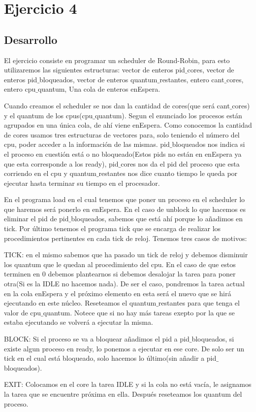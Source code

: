 \section{Ejercicio 4}

\subsection{Desarrollo}
El ejercicio consiste en programar un scheduler de Round-Robin, para esto utilizaremos las siguientes estructuras: vector de enteros pid$\_$cores, vector de enteros pid$\_$bloqueados, 
vector de enteros quantum$\_$restantes, entero cant$\_$cores, entero cpu$\_$quantum, Una cola de enteros enEspera.

Cuando creamos el scheduler se nos dan la cantidad de cores(que será cant$\_$cores) y el quantum de los cpus(cpu$\_$quantum). Segun el enunciado los procesos están agrupados 
en una única cola, de ahí viene enEspera. Como conocemos la cantidad de cores usamos tres estructuras de vectores para, solo teniendo el número del cpu, poder acceder a la 
información de las mismas. pid$\_$bloqueados nos indica si el proceso en cuestión está o no bloqueado(Estos pids no están en enEspera ya que esta corresponde a los
ready), pid$\_$cores nos da el pid del proceso que esta corriendo en el cpu y quantum$\_$restantes nos dice cuanto tiempo le queda por ejecutar hasta terminar su tiempo en el 
procesador.

En el programa load en el cual tenemos que poner un proceso en el scheduler lo que haremos será ponerlo en enEspera. En el caso de unblock lo que hacemos es eliminar el pid de 
pid$\_$bloqueados, sabemos que está ahí porque lo añadimos en tick. Por último tenemos el programa tick que se encarga de realizar los procedimientos pertinentes en cada tick de reloj. Tenemos tres casos de motivos:
 
TICK: en el mismo sabemos que ha pasado un tick de reloj y debemos disminuir los quantum que le quedan al procedimiento del cpu. En el caso de que estos terminen en 0 debemos 
plantearnos si debemos desalojar la tarea para poner otra(Si es la IDLE no hacemos nada). De ser el caso, pondremos la tarea actual en la cola enEspera y el próximo elemento
en esta será el nuevo que se hirá ejecutando en este núcleo. Reseteamos el quantum$\_$restantes para que tenga el valor de cpu$\_$quantum. Notece que si no hay más tareas
exepto por la que se estaba ejecutando se volverá a ejecutar la misma.

BLOCK: Si el proceso se va a bloquear añadimos el pid a pid$\_$bloqueados, si existe algun proceso en ready, lo ponemos a ejecutar en ese core. De solo ser un tick en el cual
está bloqueado, solo hacemos lo último(sin añadir a pid$\_$bloqueados).

EXIT: Colocamos en el core la tarea IDLE y si la cola no está vacía, le asignamos la tarea que se encuentre próxima en ella. Después reseteamos los quantum del proceso. 

